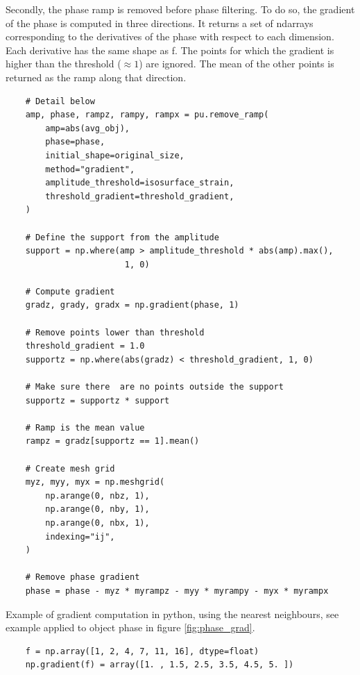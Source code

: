 Secondly, the phase ramp is removed before phase filtering. To do so, the gradient of the phase is computed in three directions. It returns a set of ndarrays corresponding to the derivatives of the phase with respect to each dimension. Each derivative has the same shape as f.
The points for which the gradient is higher than the threshold ($\approx 1$) are ignored. The mean of the other points is returned as the ramp along that direction.

\begin{verbatim}
    # Detail below
    amp, phase, rampz, rampy, rampx = pu.remove_ramp(
        amp=abs(avg_obj),
        phase=phase,
        initial_shape=original_size,
        method="gradient",
        amplitude_threshold=isosurface_strain,
        threshold_gradient=threshold_gradient,
    )
    
    # Define the support from the amplitude
    support = np.where(amp > amplitude_threshold * abs(amp).max(), 
                        1, 0)
    
    # Compute gradient
    gradz, grady, gradx = np.gradient(phase, 1)
    
    # Remove points lower than threshold
    threshold_gradient = 1.0
    supportz = np.where(abs(gradz) < threshold_gradient, 1, 0)
    
    # Make sure there  are no points outside the support
    supportz = supportz * support
    
    # Ramp is the mean value
    rampz = gradz[supportz == 1].mean()
    
    # Create mesh grid
    myz, myy, myx = np.meshgrid(
        np.arange(0, nbz, 1),
        np.arange(0, nby, 1),
        np.arange(0, nbx, 1),
        indexing="ij",
    )
    
    # Remove phase gradient
    phase = phase - myz * myrampz - myy * myrampy - myx * myrampx
\end{verbatim}

Example of gradient computation in python, using the nearest neighbours, see example applied to object phase in figure \ref{fig:phase_grad}.
\begin{verbatim}
    f = np.array([1, 2, 4, 7, 11, 16], dtype=float)
    np.gradient(f) = array([1. , 1.5, 2.5, 3.5, 4.5, 5. ])
\end{verbatim}

